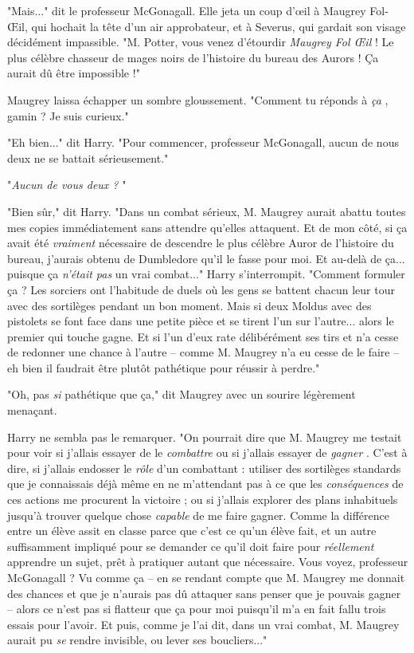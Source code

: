 "Mais..." dit le professeur McGonagall. Elle jeta un coup d'œil à Maugrey Fol-Œil, qui hochait la tête d'un air approbateur, et à Severus, qui gardait son visage décidément impassible. "M. Potter, vous venez d'étourdir \emph{Maugrey Fol Œil } ! Le plus célèbre chasseur de mages noirs de l'histoire du bureau des Aurors ! Ça aurait dû être impossible !"

Maugrey laissa échapper un sombre gloussement. "Comment tu réponds à \emph{ça} , gamin ? Je suis curieux."

"Eh bien..." dit Harry. "Pour commencer, professeur McGonagall, aucun de nous deux ne se battait sérieusement."

"\emph{Aucun de vous deux ?} "

"Bien sûr," dit Harry. "Dans un combat sérieux, M. Maugrey aurait abattu toutes mes copies immédiatement sans attendre qu'elles attaquent. Et de mon côté, si ça avait été \emph{vraiment}  nécessaire de descendre le plus célèbre Auror de l'histoire du bureau, j'aurais obtenu de Dumbledore qu'il le fasse pour moi. Et au-delà de ça... puisque ça \emph{n'était pas}  un vrai combat..." Harry s'interrompit. "Comment formuler ça ? Les sorciers ont l'habitude de duels où les gens se battent chacun leur tour avec des sortilèges pendant un bon moment. Mais si deux Moldus avec des pistolets se font face dans une petite pièce et se tirent l'un sur l'autre... alors le premier qui touche gagne. Et si l'un d'eux rate délibérément ses tirs et n'a cesse de redonner une chance à l'autre – comme M. Maugrey n'a eu cesse de le faire – eh bien il faudrait être plutôt pathétique pour réussir à perdre."

"Oh, pas \emph{si}  pathétique que ça," dit Maugrey avec un sourire légèrement menaçant.

Harry ne sembla pas le remarquer. "On pourrait dire que M. Maugrey me testait pour voir si j'allais essayer de le \emph{combattre}  ou si j'allais essayer de \emph{gagner} . C'est à dire, si j'allais endosser le \emph{rôle } d'un combattant : utiliser des sortilèges standards que je connaissais déjà même en ne m'attendant pas à ce que les \emph{conséquences}  de ces actions me procurent la victoire ; ou si j'allais explorer des plans inhabituels jusqu'à trouver quelque chose \emph{capable}  de me faire gagner. Comme la différence entre un élève assit en classe parce que c'est ce qu'un élève fait, et un autre suffisamment impliqué pour se demander ce qu'il doit faire pour \emph{réellement}  apprendre un sujet, prêt à pratiquer autant que nécessaire. Vous voyez, professeur McGonagall ? Vu comme ça – en se rendant compte que M. Maugrey me donnait des chances et que je n'aurais pas dû attaquer sans penser que je pouvais gagner – alors ce n'est pas si flatteur que ça pour moi puisqu'il m'a en fait fallu trois essais pour l'avoir. Et puis, comme je l'ai dit, dans un vrai combat, M. Maugrey aurait pu \emph{se } rendre invisible, ou lever ses boucliers..."

